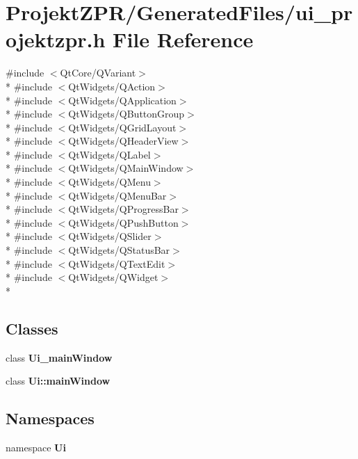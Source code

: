 \section{Projekt\-Z\-P\-R/\-Generated\-Files/ui\-\_\-projektzpr.h File Reference}
\label{ui__projektzpr_8h}
{\ttfamily \#include $<$Qt\-Core/\-Q\-Variant$>$}\\*
{\ttfamily \#include $<$Qt\-Widgets/\-Q\-Action$>$}\\*
{\ttfamily \#include $<$Qt\-Widgets/\-Q\-Application$>$}\\*
{\ttfamily \#include $<$Qt\-Widgets/\-Q\-Button\-Group$>$}\\*
{\ttfamily \#include $<$Qt\-Widgets/\-Q\-Grid\-Layout$>$}\\*
{\ttfamily \#include $<$Qt\-Widgets/\-Q\-Header\-View$>$}\\*
{\ttfamily \#include $<$Qt\-Widgets/\-Q\-Label$>$}\\*
{\ttfamily \#include $<$Qt\-Widgets/\-Q\-Main\-Window$>$}\\*
{\ttfamily \#include $<$Qt\-Widgets/\-Q\-Menu$>$}\\*
{\ttfamily \#include $<$Qt\-Widgets/\-Q\-Menu\-Bar$>$}\\*
{\ttfamily \#include $<$Qt\-Widgets/\-Q\-Progress\-Bar$>$}\\*
{\ttfamily \#include $<$Qt\-Widgets/\-Q\-Push\-Button$>$}\\*
{\ttfamily \#include $<$Qt\-Widgets/\-Q\-Slider$>$}\\*
{\ttfamily \#include $<$Qt\-Widgets/\-Q\-Status\-Bar$>$}\\*
{\ttfamily \#include $<$Qt\-Widgets/\-Q\-Text\-Edit$>$}\\*
{\ttfamily \#include $<$Qt\-Widgets/\-Q\-Widget$>$}\\*
\subsection*{Classes}
\begin{DoxyCompactItemize}
\item 
class {\bf Ui\-\_\-main\-Window}
\item 
class {\bf Ui\-::main\-Window}
\end{DoxyCompactItemize}
\subsection*{Namespaces}
\begin{DoxyCompactItemize}
\item 
namespace {\bf Ui}
\end{DoxyCompactItemize}
